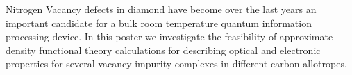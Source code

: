 Nitrogen Vacancy defects in diamond have become over the last years
an important candidate for a bulk room temperature quantum information processing device. 
In this poster we investigate the feasibility of approximate density functional theory calculations for describing optical and electronic properties for several 
vacancy-impurity complexes
in different carbon allotropes. 
